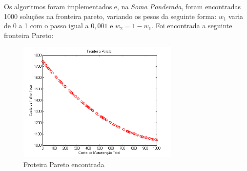Os algoritmos foram implementados e, na \emph{Soma Ponderada}, foram encontradas 1000 soluções na fronteira pareto, variando os pesos da seguinte forma: $w_1$ varia de 0 a 1 com o passo igual a $0,001$ e $w_2 = 1 - w_1$. Foi encontrada a seguinte fronteira Pareto:

\begin{figure}[h]
	\includegraphics[width=8cm]{img/pareto.png}
	\caption{Froteira Pareto encontrada}
	\label{fig:pareto}
\end{figure}
